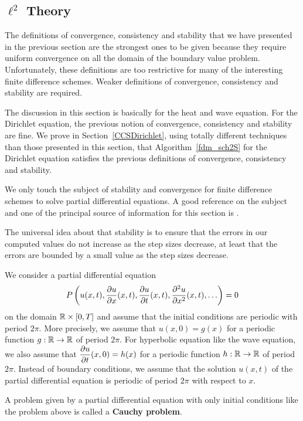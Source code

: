 \subsection{$\ell^2$ Theory} \label{ell2Theory}

The definitions of convergence, consistency and stability that we have
presented in the previous section are the strongest ones to be given
because they require uniform convergence on all the domain of the
boundary value problem.  Unfortunately, these definitions are too
restrictive for many of the interesting finite difference schemes.
Weaker definitions of convergence, consistency and stability are
required.

The discussion in this section is basically for the heat and wave
equation.  For the Dirichlet equation, the previous notion of
convergence, consistency and stability are fine.  We prove in
Section~\ref{CCSDirichlet}, using totally different techniques than
those presented in this section, that Algorithm~\ref{fdm_sch2S}
for the Dirichlet equation satisfies the previous definitions of
convergence, consistency and stability.

We only touch the subject of stability and convergence for finite
difference schemes to solve partial differential equations.  A good
reference on the subject and one of the principal source of
information for this section is \cite{WH}.  

The universal idea about that stability is to ensure that the errors
in our computed values do not increase as the step sizes decrease,
at least that the errors are bounded by a small value as the step sizes
decrease.

We consider a partial differential equation
\[
P\left(u(x,t), \frac{\partial{u}}{\partial{x}}(x,t), \frac{\partial{u}}{\partial{t}}(x,t),
\frac{\partial^{2}{u}}{\partial{x}^{2}}(x,t), \ldots \right)= 0
\]
on the domain $\mathbb{R} \times [0,T]$ and assume that the initial
conditions are periodic with period $2\pi$.  More precisely, we assume
that $u(x,0) = g(x)$ for a periodic function $g:\mathbb{R}\to \mathbb{R}$ of period
$2\pi$.  For hyperbolic equation like the wave equation, we also
assume that $\displaystyle \frac{\partial{u}}{\partial{t}}(x,0) = h(x)$ for a periodic
function $h:\mathbb{R}\to \mathbb{R}$ of period $2\pi$.   Instead of boundary
conditions, we assume that the solution $u(x,t)$ of the partial
differential equation is periodic of period $2\pi$ with respect to
$x$.

A problem given by a partial differential equation with only initial
conditions like the problem above is called a {\bfseries Cauchy
problem}.

